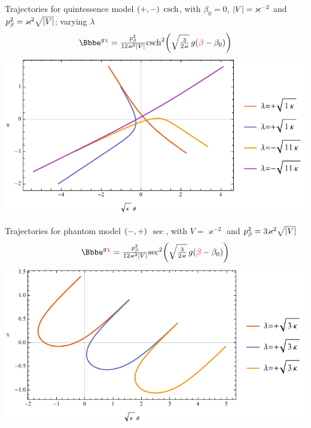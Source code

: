 \documentclass[8pt]{beamer}
\begin{document}
\begin{frame}%
{Trajectories for quintessence model ${\left(+,-\right)}$}%
{$\operatorname{csch}$, with $\beta_0 = 0$, ${\left|V\right|} = \varkappa^{-2}$ and
$p_\beta^2 = \varkappa^2\sqrt{{\left|V\right|}}$; varying $\lambda$}
\begin{align}
\ee^{g\textcolor{red}{\chi}} = 
\tfrac{p_\beta^2}{12\varkappa^2\vbr{V}}
\rfun{\csch^2}{ \sqrt{\tfrac{3}{2\varkappa}}\,g 
\rbr{\textcolor{red}{\beta}-\beta_0}}
\end{align}
\includegraphics[width=\textwidth]{../plots.nb/csch_lamb_l.pdf}

\end{frame}


\begin{frame}%
{Trajectories for phantom model ${\left(-,+\right)}$}%
{$\sec$, with $V = \varkappa^{-2}$ and
$p_\beta^2 = 3\varkappa^2\sqrt{{\left|V\right|}}$}
\begin{align}
\ee^{g\textcolor{red}{\chi}} = 
\tfrac{p_\beta^2}{12\varkappa^2\vbr{V}}
\rfun{\sec^2}{ \sqrt{\tfrac{3}{2\varkappa}}\,g 
\rbr{\textcolor{red}{\beta}-\beta_0}}
\end{align}
\includegraphics[width=\textwidth]{../plots.nb/csc_lamb_l.pdf}

\end{frame}
\end{document}
